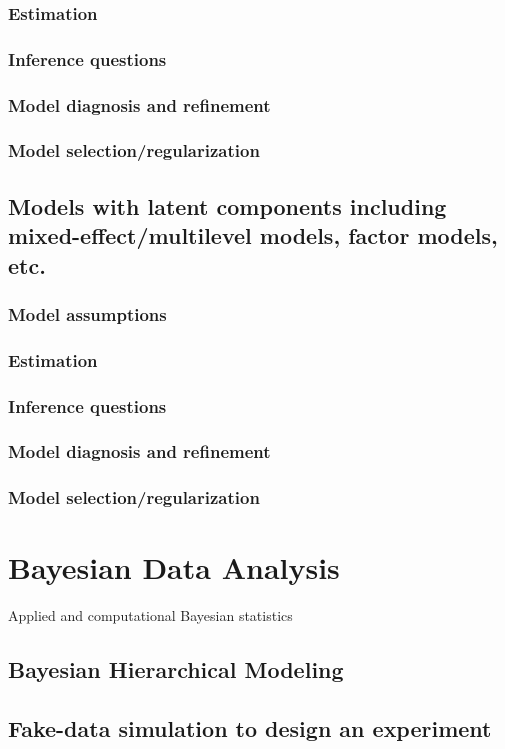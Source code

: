 \documentclass{article}
\begin{document}
\subsubsection{Estimation}
\subsubsection{Inference questions}
\subsubsection{Model diagnosis and refinement}
\subsubsection{Model selection/regularization}

\subsection{Models with latent components including mixed-effect/multilevel models, factor models, etc.}
\subsubsection{Model assumptions}
\subsubsection{Estimation}
\subsubsection{Inference questions}
\subsubsection{Model diagnosis and refinement}
\subsubsection{Model selection/regularization}

\section{Bayesian Data Analysis}
Applied and computational Bayesian statistics
\subsection{Bayesian Hierarchical Modeling}
\subsection{Fake-data simulation to design an experiment}
\end{document}
